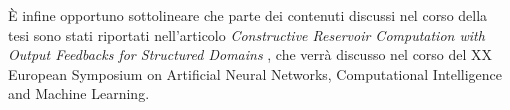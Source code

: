 \`E infine opportuno sottolineare che parte dei contenuti discussi nel corso della tesi sono stati riportati nell'articolo \textit{Constructive Reservoir Computation with Output Feedbacks for Structured Domains} \cite{Gallicchio:ConstructiveReservoir}, che verrà discusso nel corso del XX European Symposium on Artificial Neural Networks, Computational Intelligence and Machine Learning.






%
%
%
%
%
%
%
